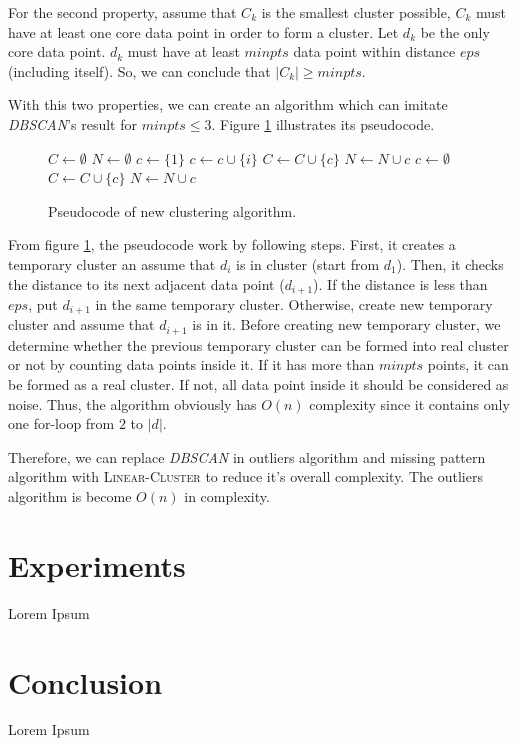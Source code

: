 \documentclass[conference]{IEEEtran}
\begin{document}
For the second property, assume that $C_{k}$ is the smallest cluster possible, $C_{k}$ must have at least one core data point in order to form a cluster. Let $d_{k}$ be the only core data point. $d_{k}$ must have at least $\textit{minpts}$ data point within distance $\textit{eps}$ (including itself). So, we can conclude that $|C_{k}| \ge \textit{minpts}$.

With this two properties, we can create an algorithm which can imitate \textit{DBSCAN}'s result for $\textit{minpts} \le 3$. Figure \ref{fig:clustering_pseudocode} illustrates its pseudocode.

\begin{figure}[H]
\begin{algorithmic}[1]
\State $C \gets \emptyset$
\State $N \gets \emptyset$
\State $c \gets \{1\}$
\State	$c \gets c \cup \{i\}$
	\Else
\State		$C \gets C \cup \{c\}$
		\Else
\State		$N \gets N \cup c$
		\EndIf
		\State $c \gets \emptyset$
	\EndIf
\EndFor
\State
{}
\State		$C \gets C \cup \{c\}$
\Else
\State		$N \gets N \cup c$
\EndIf
\State
\State	{}
\EndProcedure
\end{algorithmic}
\caption{Pseudocode of new clustering algorithm.}
\label{fig:clustering_pseudocode}
\end{figure}

From figure \ref{fig:clustering_pseudocode}, the pseudocode work by following steps. First, it creates a temporary cluster an assume that $d_{i}$ is in cluster (start from $d_{1}$). Then, it checks the distance to its next adjacent data point ($d_{i+1}$). If the distance is less than $eps$, put $d_{i+1}$ in the same temporary cluster. Otherwise, create new temporary cluster and assume that $d_{i+1}$ is in it. Before creating new temporary cluster, we determine whether the previous temporary cluster can be formed into real cluster or not by counting data points inside it. If it has more than $minpts$ points, it can be formed as a real cluster. If not, all data point inside it should be considered as noise. Thus, the algorithm obviously has $O(n)$ complexity since it contains only one for-loop from $2$ to $|d|$.

Therefore, we can replace \textit{DBSCAN} in outliers algorithm and missing pattern algorithm with \textsc{Linear-Cluster} to reduce it's overall complexity. The outliers algorithm is become $O(n)$ in complexity.


\section{Experiments}

Lorem Ipsum

\section{Conclusion}

Lorem Ipsum

\end{document}
